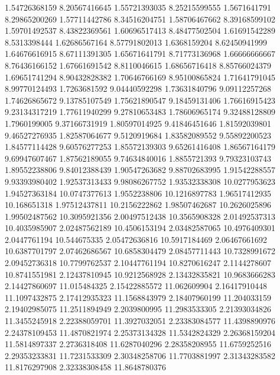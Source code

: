   1.54726368159    8.20567416645
  1.55721393035    8.25215599555
   1.5671641791    8.29865200269
  1.57711442786    8.34516204751
  1.58706467662    8.39168599102
  1.59701492537    8.43822369561
  1.60696517413    8.48477502504
  1.61691542289     8.5313398444
  1.62686567164    8.57791802013
   1.6368159204    8.62450941999
  1.64676616915    8.67111391305
  1.65671641791    8.71773136968
  1.66666666667    8.76436166152
  1.67661691542     8.8110046615
  1.68656716418    8.85766024379
  1.69651741294    8.90432828382
  1.70646766169    8.95100865824
  1.71641791045    8.99770124493
   1.7263681592    9.04440592298
  1.73631840796    9.09112257268
  1.74626865672    9.13785107549
  1.75621890547    9.18459131406
  1.76616915423    9.23134317219
  1.77611940299    9.27810653483
  1.78606965174    9.32488128809
   1.7960199005    9.37166731919
  1.80597014925    9.41846451646
  1.81592039801    9.46527276935
  1.82587064677     9.5120919684
  1.83582089552    9.55892200523
  1.84577114428    9.60576277253
  1.85572139303    9.65261416408
  1.86567164179    9.69947607467
  1.87562189055    9.74634840016
   1.8855721393    9.79323103743
  1.89552238806    9.84012388439
  1.90547263682    9.88702683995
  1.91542288557    9.93393980402
  1.92537313433    9.98086267752
  1.93532338308    10.0277953623
  1.94527363184    10.0747377613
   1.9552238806    10.1216897783
  1.96517412935     10.168651318
  1.97512437811    10.2156222862
  1.98507462687    10.2626025896
  1.99502487562    10.3095921356
  2.00497512438    10.3565908328
  2.01492537313    10.4035985907
  2.02487562189    10.4506153194
  2.03482587065    10.4976409301
   2.0447761194     10.544675335
  2.05472636816    10.5917184469
  2.06467661692    10.6387701797
  2.07462686567    10.6858304479
  2.08457711443    10.7328991672
  2.09452736318    10.7799762537
  2.10447761194    10.8270616247
   2.1144278607    10.8741551981
  2.12437810945    10.9212568928
  2.13432835821    10.9683666283
  2.14427860697     11.015484325
  2.15422885572     11.062609904
  2.16417910448    11.1097432875
  2.17412935323    11.1568843979
  2.18407960199     11.204033159
  2.19402985075    11.2511894949
   2.2039800995    11.2983533305
  2.21393034826    11.3455245918
  2.22388059701    11.3927032051
  2.23383084577    11.4398890976
  2.24378109453    11.4870821974
  2.25373134328    11.5342824329
  2.26368159204    11.5814897337
   2.2736318408    11.6287040296
  2.28358208955    11.6759252516
  2.29353233831    11.7231533309
  2.30348258706    11.7703881997
  2.31343283582    11.8176297908
  2.32338308458    11.8648780376
